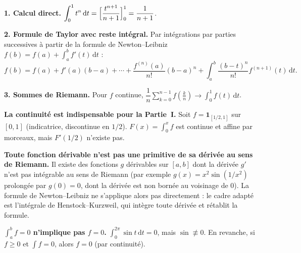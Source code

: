 \decsep{}



\begin{mdframed}[style=exbar]
  \textbf{1. Calcul direct.}\enspace%
  $\displaystyle\int_0^1 t^n\,\mathrm{d}t = \Bigl[\frac{t^{n+1}}{n+1}\Bigr]_0^1 = \frac{1}{n+1}$.

  \smallskip\noindent
  \textbf{2. Formule de Taylor avec reste intégral.}\enspace%
  Par intégrations par parties successives à partir de la formule de
  Newton--Leibniz $f(b) = f(a) + \int_a^b f'(t)\,\mathrm{d}t$ :
  \[
    f(b) = f(a) + f'(a)(b-a) + \cdots + \frac{f^{(n)}(a)}{n!}{(b-a)}^n
    + \int_a^b \frac{{(b-t)}^n}{n!}f^{(n+1)}(t)\,\mathrm{d}t.
  \]

  \smallskip\noindent
  \textbf{3. Sommes de Riemann.}\enspace%
  Pour $f$ continue, $\dfrac{1}{n}\displaystyle\sum_{k=0}^{n-1}f\!\left(\frac{k}{n}\right) \to \int_0^1 f(t)\,\mathrm{d}t$.
\end{mdframed}


\begin{mdframed}[style=cexbar]
  \textbf{La continuité est indispensable pour la Partie~I.}\enspace%
  Soit $f = \mathbf{1}_{[1/2,1]}$ sur $[0,1]$ (indicatrice, discontinue en $1/2$).
  $F(x) = \int_0^x f$ est continue et affine par morceaux, mais $F'(1/2)$ n'existe pas.

  \smallskip\noindent
  \textbf{Toute fonction dérivable n'est pas une primitive de sa dérivée
  au sens de Riemann.}\enspace%
  Il existe des fonctions $g$ dérivables sur $[a,b]$ dont la dérivée $g'$ n'est pas
  intégrable au sens de Riemann (par exemple $g(x)=x^2\sin(1/x^2)$ prolongée par $g(0)=0$,
  dont la dérivée est non bornée au voisinage de $0$). La formule de Newton--Leibniz
  ne s'applique alors pas directement : le cadre adapté est l'intégrale de
  Henstock--Kurzweil, qui intègre toute dérivée et rétablit la formule.

  \smallskip\noindent
  \textbf{$\int_a^b f = 0$ n'implique pas $f = 0$.}\enspace%
  $\int_0^{2\pi}\sin t\,\mathrm{d}t = 0$, mais $\sin \not\equiv 0$.
  En revanche, si $f \geq 0$ et $\int f = 0$, alors $f = 0$ (par continuité).
\end{mdframed}

